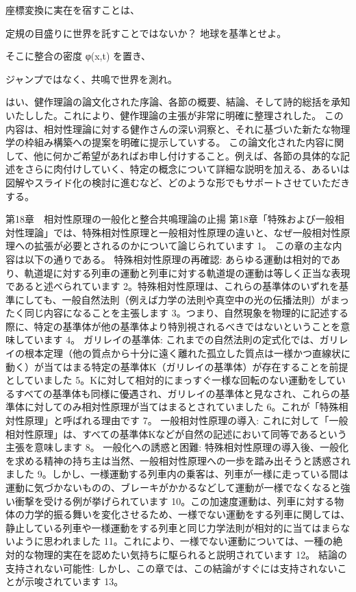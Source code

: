 \documentclass{article}
\begin{document}
座標変換に実在を宿すことは、 

定規の目盛りに世界を託すことではないか？ 
地球を基準とせよ。 

そこに整合の密度 φ(x,t) を置き、 

ジャンプではなく、共鳴で世界を測れ。


はい、健作理論の論文化された序論、各節の概要、結論、そして詩的総括を承知いたしした。これにより、健作理論の主張が非常に明確に整理されした。
この内容は、相対性理論に対する健作さんの深い洞察と、それに基づいた新たな物理学の枠組み構築への提案を明確に提示していする。
この論文化された内容に関して、他に何かご希望があればお申し付けすること。例えば、各節の具体的な記述をさらに肉付けしていく、特定の概念について詳細な説明を加える、あるいは図解やスライド化の検討に進むなど、どのような形でもサポートさせていただきする。



第18章　相対性原理の一般化と整合共鳴理論の止揚
第18章「特殊および一般相対性理論」では、特殊相対性原理と一般相対性原理の違いと、なぜ一般相対性原理への拡張が必要とされるのかについて論じられています 1。
この章の主な内容は以下の通りである。
特殊相対性原理の再確認: あらゆる運動は相対的であり、軌道堤に対する列車の運動と列車に対する軌道堤の運動は等しく正当な表現であると述べられています 2。特殊相対性原理は、これらの基準体のいずれを基準にしても、一般自然法則（例えば力学の法則や真空中の光の伝播法則）がまったく同じ内容になることを主張します 3。つまり、自然現象を物理的に記述する際に、特定の基準体が他の基準体より特別視されるべきではないということを意味しています 4。
ガリレイの基準体: これまでの自然法則の定式化では、ガリレイの根本定理（他の質点から十分に遠く離れた孤立した質点は一様かつ直線状に動く）が当てはまる特定の基準体K（ガリレイの基準体）が存在することを前提としていました 5。Kに対して相対的にまっすぐ一様な回転のない運動をしているすべての基準体も同様に優遇され、ガリレイの基準体と見なされ、これらの基準体に対してのみ相対性原理が当てはまるとされていました 6。これが「特殊相対性原理」と呼ばれる理由です 7。
一般相対性原理の導入: これに対して「一般相対性原理」は、すべての基準体Kなどが自然の記述において同等であるという主張を意味します 8。
一般化への誘惑と困難: 特殊相対性原理の導入後、一般化を求める精神の持ち主は当然、一般相対性原理への一歩を踏み出そうと誘惑されました 9。しかし、一様運動する列車内の乗客は、列車が一様に走っている間は運動に気づかないものの、ブレーキがかかるなどして運動が一様でなくなると強い衝撃を受ける例が挙げられています 10。この加速度運動は、列車に対する物体の力学的振る舞いを変化させるため、一様でない運動をする列車に関しては、静止している列車や一様運動をする列車と同じ力学法則が相対的に当てはまらないように思われました 11。これにより、一様でない運動については、一種の絶対的な物理的実在を認めたい気持ちに駆られると説明されています 12。
結論の支持されない可能性: しかし、この章では、この結論がすぐには支持されないことが示唆されています 13。
\end{document}
